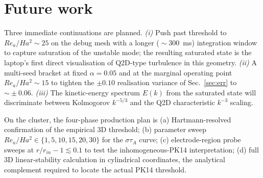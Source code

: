 \documentclass[aps,prl,twocolumn,superscriptaddress]{revtex4-2}
\begin{document}
\section{Future work}

Three immediate continuations are planned.  \textit{(i)} Push past
threshold to $Re_a/Ha^{2}\!\sim\!25$ on the debug mesh with a longer
($\!\sim\!300$~ms) integration window to capture saturation of the
unstable mode; the resulting saturated state is the laptop's first
direct visualisation of Q2D-type turbulence in this geometry.
\textit{(ii)} A multi-seed bracket at fixed $\alpha = 0.05$ and at
the marginal operating point $Re_a/Ha^{2}\!\sim\!15$ to tighten the
$\pm 0.10$ realisation variance of Sec.~\ref{sec:err} to
$\sim\!\pm 0.06$.  \textit{(iii)} The kinetic-energy spectrum
$E(k)$ from the saturated state will discriminate between Kolmogorov
$k^{-5/3}$ and the Q2D characteristic $k^{-3}$ scaling.

On the cluster, the four-phase production plan is
(a) Hartmann-resolved confirmation of the empirical 3D threshold;
(b) parameter sweep $Re_a/Ha^{2}\in\{1, 5, 10, 15, 20, 30\}$ for the
$\sigma\tau_A$ curve; (c) electrode-region probe sweeps at
$r/r_{in}-1\!\lesssim\!0.1$ to test the inhomogeneous-PK14
interpretation; (d) full 3D linear-stability calculation in
cylindrical coordinates, the analytical complement required to
locate the actual PK14 threshold.
\end{document}
